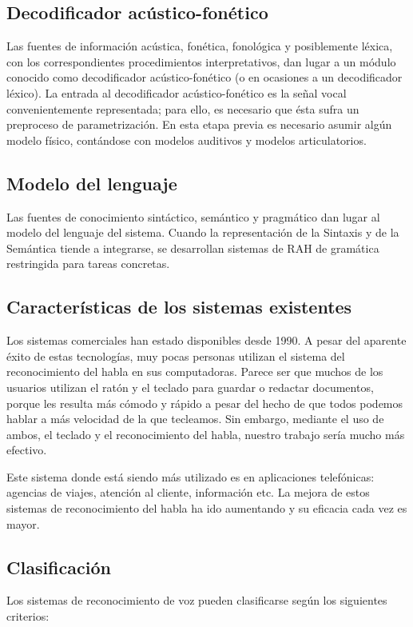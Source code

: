 \documentclass[a4paper,11pt]{article}
\begin{document}
 \subsection{Decodificador acústico-fonético}
 Las fuentes de información acústica, fonética, fonológica y posiblemente léxica, con los correspondientes procedimientos interpretativos, dan lugar a un módulo conocido como decodificador acústico-fonético (o en ocasiones a un decodificador léxico). La entrada al decodificador acústico-fonético es la señal vocal convenientemente representada; para ello, es necesario que ésta sufra un preproceso de parametrización. En esta etapa previa es necesario asumir algún modelo físico, contándose con modelos auditivos y modelos articulatorios.
 \subsection{Modelo del lenguaje}
 
 Las fuentes de conocimiento sintáctico, semántico y pragmático dan lugar al modelo del lenguaje del sistema. Cuando la representación de la Sintaxis y de la Semántica tiende a integrarse, se desarrollan sistemas de RAH de gramática restringida para tareas concretas.
 
\subsection{Características de los sistemas existentes}
Los sistemas comerciales han estado disponibles desde 1990. A pesar del aparente éxito de estas tecnologías, muy pocas personas utilizan el sistema del reconocimiento del habla en sus computadoras. Parece ser que muchos de los usuarios utilizan el ratón y el teclado para guardar o redactar documentos, porque les resulta más cómodo y rápido a pesar del hecho de que todos podemos hablar a más velocidad de la que tecleamos. Sin embargo, mediante el uso de ambos, el teclado y el reconocimiento del habla, nuestro trabajo sería mucho más efectivo.

Este sistema donde está siendo más utilizado es en aplicaciones telefónicas: agencias de viajes, atención al cliente, información etc. La mejora de estos sistemas de reconocimiento del habla ha ido aumentando y su eficacia cada vez es mayor.


\subsection{Clasificación}
Los sistemas de reconocimiento de voz pueden clasificarse según los siguientes criterios:
\end{document}
